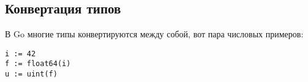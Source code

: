 \subsection{Конвертация типов}
В Go многие типы конвертируются между собой, вот пара числовых примеров:
\begin{verbatim}
i := 42
f := float64(i)
u := uint(f)
\end{verbatim}

